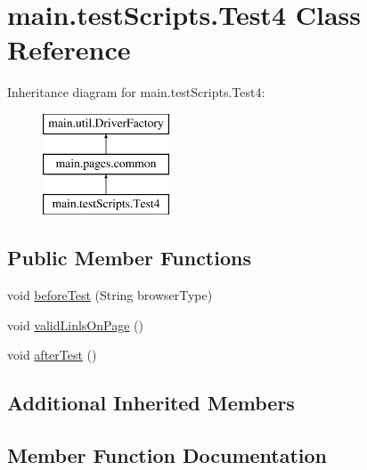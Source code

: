 \hypertarget{classmain_1_1test_scripts_1_1_test4}{}\section{main.\+test\+Scripts.\+Test4 Class Reference}
\label{classmain_1_1test_scripts_1_1_test4}
Inheritance diagram for main.\+test\+Scripts.\+Test4\+:\begin{figure}[H]
\begin{center}
\leavevmode
\includegraphics[height=3.000000cm]{classmain_1_1test_scripts_1_1_test4}
\end{center}
\end{figure}
\subsection*{Public Member Functions}
\begin{DoxyCompactItemize}
\item 
void \mbox{\hyperlink{classmain_1_1test_scripts_1_1_test4_a05a50b74977f548b1bfef2a49a114a3a}{before\+Test}} (String browser\+Type)
\item 
void \mbox{\hyperlink{classmain_1_1test_scripts_1_1_test4_ab572b49f4fa2052ad6428c1b0563c9ea}{valid\+Linls\+On\+Page}} ()
\item 
void \mbox{\hyperlink{classmain_1_1test_scripts_1_1_test4_a9a4eac7690ddbe8e60a940e54f7775b7}{after\+Test}} ()
\end{DoxyCompactItemize}
\subsection*{Additional Inherited Members}


\subsection{Member Function Documentation}
\mbox{\label{classmain_1_1test_scripts_1_1_test4_a9a4eac7690ddbe8e60a940e54f7775b7}} 
